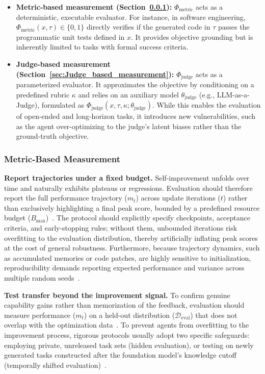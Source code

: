 \documentclass{article}
\begin{document}
\begin{itemize}
    \item \textbf{Metric-based measurement (Section~\ref{sec:Metric_based_measurement}):} $\Phi_{\text{metric}}$ acts as a deterministic, executable evaluator. For instance, in software engineering, $\Phi_{\text{metric}}(x, \tau) \in \{0, 1\}$ directly verifies if the generated code in $\tau$ passes the programmatic unit tests defined in $x$. It provides objective grounding but is inherently limited to tasks with formal success criteria.
    \item \textbf{Judge-based measurement (Section~\ref{sec:Judge_based_measurement}):} $\Phi_{\text{judge}}$ acts as a parameterized evaluator. It approximates the  objective by conditioning on a predefined rubric $\kappa$ and relies on an auxiliary model $\theta_{\text{judge}}$ (e.g., LLM-as-a-Judge), formulated as $\Phi_{\text{judge}}(x, \tau, \kappa; \theta_{\text{judge}})$. While this enables the evaluation of open-ended and long-horizon tasks, it introduces new vulnerabilities, such as the agent over-optimizing to the judge's latent biases rather than the ground-truth objective.
\end{itemize}


\subsubsection{Metric-Based Measurement}
\label{sec:Metric_based_measurement}



\textbf{Report trajectories under a fixed budget.}
Self-improvement unfolds over time and naturally exhibits plateaus or regressions. Evaluation should therefore report the full performance trajectory ($m_t$) across update iterations ($t$) rather than exclusively highlighting a final peak score,  bounded by a predefined resource budget ($B_{\text{max}}$)~\citep{xi2024agentgym}. The protocol should explicitly specify checkpoints, acceptance criteria, and early-stopping rules; without them, unbounded iterations risk overfitting to the evaluation distribution, thereby artificially inflating peak scores at the cost of general robustness. Furthermore, because trajectory dynamics, such as accumulated memories or code patches, are highly sensitive to initialization, reproducibility demands reporting expected performance and variance across multiple random seeds~\citep{siegel2024corebenchfosteringcredibilitypublished, aleithan2024swebenchenhancedcodingbenchmark}.


\textbf{Test transfer beyond the improvement signal.}
To confirm genuine capability gains rather than  memorization of the feedback, evaluation should measure performance ($m_t$) on a  held-out distribution ($\mathcal{D}_{\text{eval}}$) that does not overlap with the optimization data~\citep{deng2023mindweb, lu2024weblinx}. To prevent agents from overfitting to the improvement process, rigorous protocols usually adopt two specific safeguards: employing private, unreleased task sets (hidden evaluation), or testing on newly generated tasks constructed after the foundation model's knowledge cutoff (temporally shifted evaluation)~\citep{gu2023maniskill2unifiedbenchmarkgeneralizable, mialon2023gaiabenchmarkgeneralai}.
\end{document}
